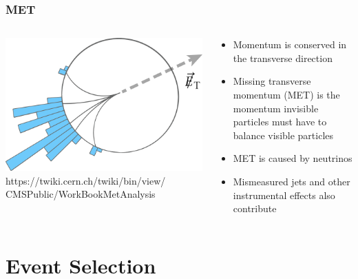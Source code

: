 \documentclass{beamer}
\begin{document}
\begin{frame}
  \frametitle{MET}

  \begin{columns}
    \begin{column}{0.4\linewidth}
      \includegraphics[width=\linewidth]{figures/met_schematic_800.png}
      \tiny{https://twiki.cern.ch/twiki/bin/view/\\CMSPublic/WorkBookMetAnalysis}
    \end{column}
    \begin{column}{0.6\linewidth}
      \begin{itemize}
      \item Momentum is conserved in the transverse direction
      \item Missing transverse momentum (MET) is the momentum invisible particles must have
        to balance visible particles
      \item MET is caused by neutrinos
      \item Mismeasured jets and other instrumental effects also contribute
      \end{itemize}
    \end{column}
  \end{columns}

\end{frame}

\section{Event Selection}
\end{document}
